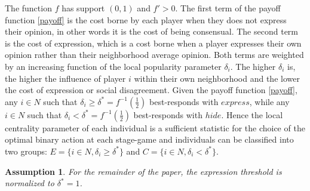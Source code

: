 \documentclass{article}
\newtheorem{assumption}{Assumption}
\begin{document}
\noindent The function $f$ has support $(0,1)$ and $f' >0$. The first term of the payoff function \eqref{payoff} is the cost borne by each player when they does not express their opinion, in other words it is the cost of being consensual. The second term is the cost of expression, which is a cost borne when a player expresses their own opinion rather than their neighborhood average opinion. Both terms are weighted by an increasing function of the local popularity parameter $\delta_i$. The higher $\delta_i$ is, the higher the influence of player $i$ within their own neighborhood and the lower the cost of expression or social disagreement. 
 Given the payoff function \eqref{payoff}, any $i \in N$ such that $\delta_i \geq \delta^{*} =f^{-1}(\frac{1}{2 }) $ best-responds with $express$, while any $i \in N$ such that $\delta_i < \delta^{*} =f^{-1}(\frac{1}{2 }) $ best-responds with $hide$. Hence the local centrality parameter of each individual is a sufficient statistic for the choice of the optimal binary action at each stage-game and individuals can be classified into two groups: $E=\{ i \in N, \delta_i \geq \delta^{*}\}$ and $C=\{ i \in N, \delta_i < \delta^{*} \}$.
\begin{assumption}
For the remainder of the paper, the expression threshold is normalized to $\delta^{*}=1$.
\end{assumption}
\end{document}

